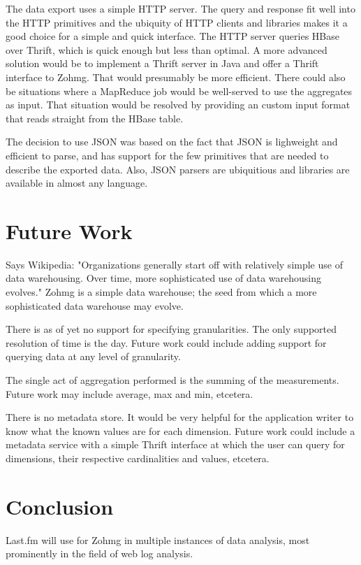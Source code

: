 The data export uses a simple HTTP server. The query and response fit well into
the HTTP primitives and the ubiquity of HTTP clients and libraries makes it a
good choice for a simple and quick interface. The HTTP server queries HBase over
Thrift, which is quick enough but less than optimal. A more advanced solution
would be to implement a Thrift server in Java and offer a Thrift interface to
Zohmg. That would presumably be more efficient. There could also be situations
where a MapReduce job would be well-served to use the aggregates as input. That
situation would be resolved by providing an custom input format that reads
straight from the HBase table.

The decision to use JSON was based on the fact that JSON is lighweight and
efficient to parse, and has support for the few primitives that are needed to
describe the exported data. Also, JSON parsers are ubiquitious and libraries are
available in almost any language.


\section{Future Work}

Says Wikipedia: "Organizations generally start off with relatively simple use of
data warehousing. Over time, more sophisticated use of data warehousing
evolves." Zohmg is a simple data warehouse; the seed from which a more
sophisticated data warehouse may evolve.

There is as of yet no support for specifying granularities. The only supported
resolution of time is the day. Future work could include adding support for
querying data at any level of granularity.

The single act of aggregation performed is the summing of the measurements.
Future work may include average, max and min, etcetera.

There is no metadata store. It would be very helpful for the application writer
to know what the known values are for each dimension. Future work could include
a metadata service with a simple Thrift interface at which the user can query
for dimensions, their respective cardinalities and values, etcetera.


\section{Conclusion}

Last.fm will use for Zohmg in multiple instances of data analysis, most
prominently in the field of web log analysis.


